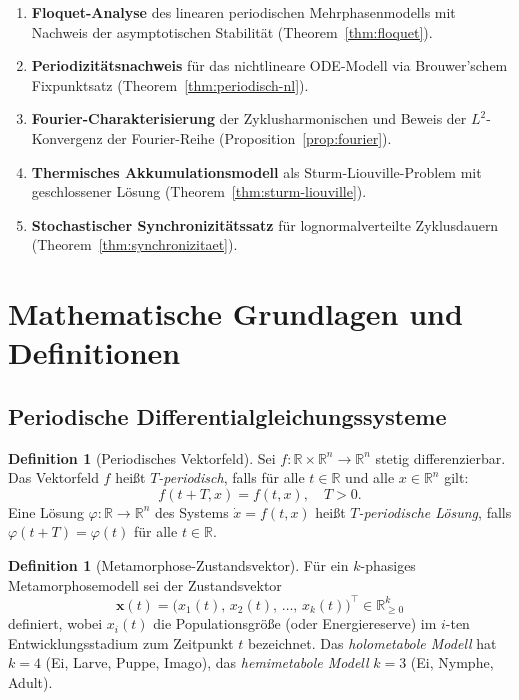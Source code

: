 ﻿\documentclass[12pt, a4paper]{article}
\theoremstyle{definition}
\newtheorem{definition}[theorem]{Definition}
\newcommand{\R}{\mathbb{R}}
\begin{document}
\begin{enumerate}
  \item \textbf{Floquet-Analyse} des linearen periodischen Mehrphasenmodells mit
        Nachweis der asymptotischen Stabilität (Theorem~\ref{thm:floquet}).
  \item \textbf{Periodizitätsnachweis} für das nichtlineare ODE-Modell via
        Brouwer'schem Fixpunktsatz (Theorem~\ref{thm:periodisch-nl}).
  \item \textbf{Fourier-Charakterisierung} der Zyklusharmonischen und Beweis der
        $L^2$-Konvergenz der Fourier-Reihe (Proposition~\ref{prop:fourier}).
  \item \textbf{Thermisches Akkumulationsmodell} als Sturm-Liouville-Problem mit
        geschlossener Lösung (Theorem~\ref{thm:sturm-liouville}).
  \item \textbf{Stochastischer Synchronizitätssatz} für lognormalverteilte
        Zyklusdauern (Theorem~\ref{thm:synchronizitaet}).
\end{enumerate}

\section{Mathematische Grundlagen und Definitionen}

\subsection{Periodische Differentialgleichungssysteme}

\begin{definition}[Periodisches Vektorfeld]\label{def:periodisch}
Sei $f: \R \times \R^n \to \R^n$ stetig differenzierbar. Das Vektorfeld $f$
heißt \emph{$T$-periodisch}, falls für alle $t \in \R$ und alle $x \in \R^n$ gilt:
\[
  f(t + T, x) = f(t, x), \quad T > 0.
\]
Eine Lösung $\varphi: \R \to \R^n$ des Systems $\dot{x} = f(t, x)$ heißt
\emph{$T$-periodische Lösung}, falls $\varphi(t + T) = \varphi(t)$ für alle
$t \in \R$.
\end{definition}

\begin{definition}[Metamorphose-Zustandsvektor]\label{def:zustandsvektor}
Für ein $k$-phasiges Metamorphosemodell sei der Zustandsvektor
\[
  \bm{x}(t) = \bigl(x_1(t),\, x_2(t),\, \ldots,\, x_k(t)\bigr)^\top \in \R_{\geq 0}^k
\]
definiert, wobei $x_i(t)$ die Populationsgröße (oder Energiereserve) im $i$-ten
Entwicklungsstadium zum Zeitpunkt $t$ bezeichnet. Das \emph{holometabole Modell}
hat $k = 4$ (Ei, Larve, Puppe, Imago), das \emph{hemimetabole Modell} $k = 3$
(Ei, Nymphe, Adult).
\end{definition}
\end{document}
